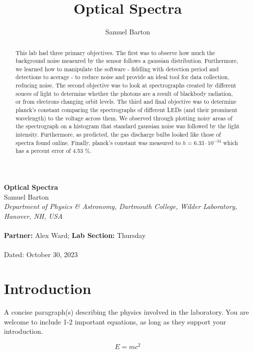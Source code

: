 \documentclass{article}[12pt]
\begin{document}
\title{Optical Spectra}
\author{Samuel Barton}


\begin{center}
\large{\textbf{Optical Spectra}}\\
\bigskip
\small{Samuel Barton}\\
\small{\textit{Department of Physics \& Astronomy, Dartmouth College, Wilder Laboratory, Hanover, NH, USA}}\\
~\\
\small{\textbf{Partner:} Alex Ward; \textbf{Lab Section:} Thursday }\\
~\\
Dated: October 30, 2023\\

\end{center}

\bigskip
\begin{abstract}
  This lab had three primary objectives.
  The first was to observe how much the background noise measured by the sensor follows a gaussian distribution. Furthermore, we learned how to manipulate the software - fiddling with detection period and detections to acerage - to reduce noise and provide an ideal tool for data collection, reducing noise.
  The second objective was to look at spectrographs created by different souces of light to determine whether the photons are a result of blackbody radiation, or from electrons changing orbit levels.
  The third and final objective was to determine planck's constant comparing the spectrographs of different LEDs (and their prominent wavelength) to the voltage across them.
  We observed through plotting noisy areas of the spectrograph on a histogram that standard gaussian noise was followed by the light intensity.
  Furthermore, as predicted, the gas discharge bulbs looked like those of spectra found online.
  Finally, planck's constant was measured to $ h = 6.33 \cdot 10^{-34}  $ which has a percent error of 4.53 \%.
\end{abstract}
\bigskip

\section{Introduction}

A concise paragraph(s) describing the physics involved in the laboratory. You are welcome to include 1-2 important equations, as long as they support your introduction.

\begin{equation}
E = mc^2
\end{equation}
\end{document}
